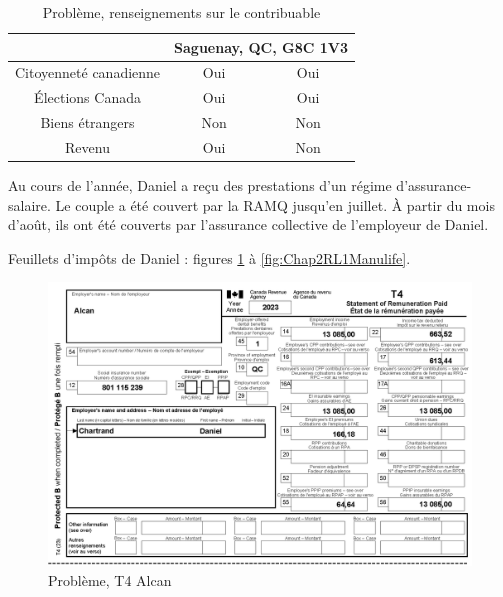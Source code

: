 \begin{table}
\begin{tabular}{|c|c|c|}
		                                 &  \multicolumn{2}{c|}{Saguenay, QC, G8C 1V3}   \\ \hline
		     Citoyenneté canadienne      &           Oui            &        Oui         \\ \hline
		        Élections Canada         &           Oui            &        Oui         \\ \hline
		        Biens étrangers          &           Non            &        Non         \\ \hline
		             Revenu              &           Oui            &        Non         \\ \hline
	\end{tabular}
	\caption[]{Problème, renseignements sur le contribuable}
	\label{table:pb2}
\end{table}

Au cours de l'année, Daniel a reçu des prestations d'un régime d'assurance-salaire. Le couple a été couvert par la RAMQ jusqu'en juillet. À partir du mois d'août, ils ont été couverts par l'assurance collective de l'employeur de Daniel.

Feuillets d'impôts de Daniel : figures \ref{fig:pb2T4Alcan} à \ref{fig:Chap2RL1Manulife}.

\begin{figure}
	\centering
	\includegraphics[width=.9\textwidth]{probleme/chapitre-2/T4-Alcan.png}
	\caption[]{Problème, T4 Alcan}
	\label{fig:pb2T4Alcan}
\end{figure}

